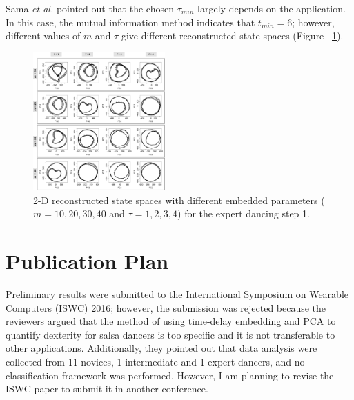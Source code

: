 \documentclass[10pt,journal,compsoc]{IEEEtran}
\begin{document}
Sama \textit{et al.} \cite{Sama2013} pointed out that the chosen $\tau_{min}$ largely 
depends on the application. In this case, the mutual information 
method indicates that $t_{min} =  6$; however, different 
values of $m$ and $\tau$ give different reconstructed state spaces 
(Figure ~\ref{fig:takens_problem}).


\begin{figure}[htbp!] 
\centering    
\includegraphics[width=0.45\textwidth]{takens}
\caption[PA]{2-D reconstructed state spaces with different embedded parameters 
($m=10,20,30,40$ and $\tau= 1,2,3,4$) for the expert dancing step 1.}
\label{fig:takens_problem}
\end{figure}




\section{Publication Plan}
Preliminary results were submitted to the International 
Symposium on Wearable Computers (ISWC) 2016; however, 
the submission was rejected because the reviewers argued 
that the method of using time-delay embedding and PCA
to quantify dexterity for salsa dancers is too specific and
it is not transferable to other applications. Additionally, 
they pointed out that data analysis were collected from 
11 novices, 1 intermediate and 1 expert dancers, and no 
classification framework was performed. However, I am 
planning to revise the ISWC paper to submit it in 
another conference.
\end{document}
